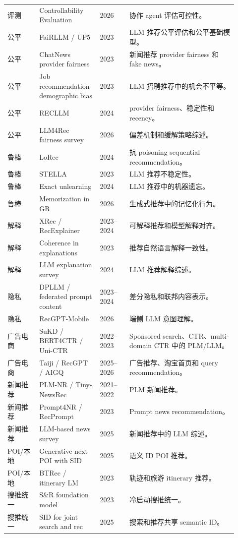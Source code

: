 \documentclass[UTF8,fontset=fandol,11pt]{ctexart}
\begin{document}
\begin{longtable}{@{}p{0.13\linewidth}p{0.23\linewidth}p{0.12\linewidth}p{0.44\linewidth}@{}}
评测 & Controllability Evaluation & 2026 & 协作 agent 评估可控性。\\
公平 & FaiRLLM / UP5 & 2023 & LLM 推荐公平评估和公平基础模型。\\
公平 & ChatNews provider fairness & 2023 & 新闻推荐 provider fairness 和 fake news。\\
公平 & Job recommendation demographic bias & 2023 & LLM 招聘推荐中的机会不平等。\\
公平 & RECLLM & 2024 & provider fairness、稳定性和 recency。\\
公平 & LLM4Rec fairness survey & 2026 & 偏差机制和缓解策略综述。\\
鲁棒 & LoRec & 2024 & 抗 poisoning sequential recommendation。\\
鲁棒 & STELLA & 2023 & LLM 推荐不稳定性。\\
鲁棒 & Exact unlearning & 2024 & LLM 推荐中的机器遗忘。\\
鲁棒 & Memorization in GR & 2026 & 生成式推荐中的记忆化行为。\\
解释 & XRec / RecExplainer & 2023--2024 & 可解释推荐和模型解释对齐。\\
解释 & Coherence in explanations & 2023 & 推荐自然语言解释一致性。\\
解释 & LLM explanation survey & 2024 & LLM 推荐解释综述。\\
隐私 & DPLLM / federated prompt content & 2023--2024 & 差分隐私和联邦内容表示。\\
隐私 & RecGPT-Mobile & 2026 & 端侧 LLM 意图理解。\\
广告电商 & SuKD / BERT4CTR / Uni-CTR & 2022--2023 & Sponsored search、CTR、multi-domain CTR 中的 PLM/LLM。\\
广告电商 & Taiji / RecGPT / AIGQ & 2025--2026 & 广告推荐、淘宝首页和 query recommendation。\\
新闻推荐 & PLM-NR / Tiny-NewsRec & 2021--2022 & PLM 新闻推荐。\\
新闻推荐 & Prompt4NR / RecPrompt & 2023 & Prompt news recommendation。\\
新闻推荐 & LLM-based news survey & 2025 & 新闻推荐中的 LLM 综述。\\
POI/本地 & Generative next POI with SID & 2025 & 语义 ID POI 推荐。\\
POI/本地 & BTRec / itinerary LM & 2023 & 轨迹和旅游 itinerary 推荐。\\
搜推统一 & S\&R foundation model & 2023 & 冷启动搜推统一。\\
搜推统一 & SID for joint search and rec & 2025 & 搜索和推荐共享 semantic ID。\\

\end{longtable}
\end{document}

